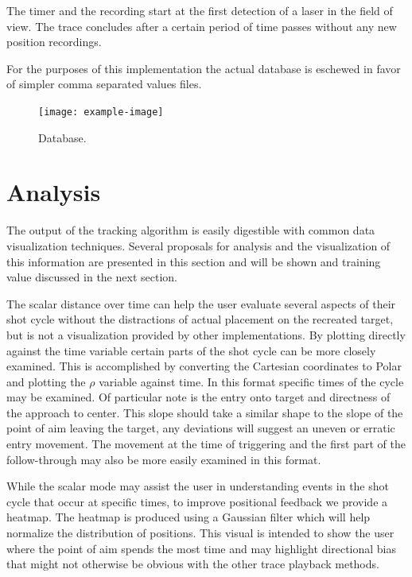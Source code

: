 \documentclass[conference]{IEEEtran}
\begin{document}
The timer and the recording start at the first detection of a laser in the field of view.
The trace concludes after a certain period of time passes without any new position recordings.

For the purposes of this implementation the actual database is eschewed in favor of simpler comma separated values files.

\begin{figure}[]
	\centering
	\texttt{[image: example-image]}
	\caption{Database.}
	\label{fig:database}
\end{figure}


\section{Analysis}

The output of the tracking algorithm is easily digestible with common data visualization techniques.
Several proposals for analysis and the visualization of this information are presented in this section and will be shown and training value discussed in the next section.

The scalar distance over time can help the user evaluate several aspects of their shot cycle without the distractions of actual placement on the recreated target,
but is not a visualization provided by other implementations.
By plotting directly against the time variable certain parts of the shot cycle
\cite{Zeljko2020}
can be more closely examined.
This is accomplished by converting the Cartesian coordinates to Polar and plotting the $\rho$ variable against time.
In this format specific times of the cycle may be examined.
Of particular note is the entry onto target and directness of the approach to center.
This slope should take a similar shape to the slope of the point of aim leaving the target, any deviations will suggest an uneven or erratic entry movement.
The movement at the time of triggering and the first part of the follow-through may also be more easily examined in this format.

While the scalar mode may assist the user in understanding events in the shot cycle that occur at specific times, to improve positional feedback we provide a heatmap.
The heatmap is produced using a Gaussian filter which will help normalize the distribution of positions.
This visual is intended to show the user where the point of aim spends the most time and may highlight directional bias that might not otherwise be obvious with the other trace playback methods.
\end{document}
